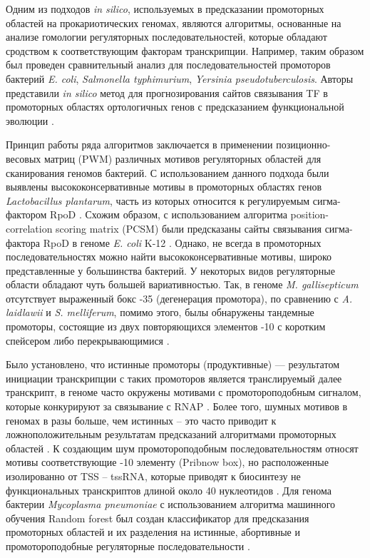 \documentclass[14pt]{extreport}
\begin{document}
Одним из подходов \textit{in silico}, используемых в предсказании промоторных областей на прокариотических геномах, являются алгоритмы, основанные на анализе гомологии регуляторных последовательностей, которые обладают сродством к соответствующим факторам транскрипции. Например, таким образом был проведен сравнительный анализ для последовательностей промоторов бактерий \textit{E. coli}, \textit{Salmonella typhimurium}, \textit{Yersinia pseudotuberculosis}. Авторы представили \textit{in silico} метод для прогнозирования сайтов связывания TF в промоторных областях ортологичных генов с предсказанием функциональной эволюции \cite{mustonen2005evolutionary}.

Принцип работы ряда алгоритмов заключается в применении позиционно-весовых матриц (PWM) различных мотивов регуляторных областей для сканирования геномов бактерий. С использованием данного подхода были выявлены высококонсервативные мотивы в промоторных областях генов \textit{Lactobacillus plantarum}, часть из которых относится к регулируемым сигма-фактором RpoD \cite{todt2012genome}. Схожим образом, с использованием алгоритма position-correlation scoring matrix (PCSM) были предсказаны сайты связывания сигма-фактора RpoD в геноме \textit{E. coli} K-12 \cite{li2006recognition}. Однако, не всегда в промоторных последовательностях можно найти высококонсервативные мотивы, широко представленные у большинства бактерий. У некоторых видов регуляторные области обладают чуть большей вариативностью. Так, в геноме \textit{M. gallisepticum} отсутствует выраженный бокс -35 (дегенерация промотора), по сравнению с \textit{A. laidlawii} и \textit{S. melliferum}, помимо этого, былы обнаружены тандемные промоторы, состоящие из двух повторяющихся элементов -10 с коротким спейсером либо перекрывающимися \cite{fisunov2016reconstruction}.

Было установлено, что истинные промоторы (продуктивные) --- результатом инициации транскрипции с таких промоторов является транслируемый далее транскрипт, в геноме часто окружены мотивами с промотороподобным сигналом, которые конкурируют за связывание с RNAP \cite{huerta2003sigma70}. Более того, шумных мотивов в геномах в разы больше, чем истинных -- это часто приводит к ложноположительным результатам предсказаний алгоритмами промоторных областей \cite{hertz19962, horton1992assessment}. К создающим шум промотороподобным последовательностям относят мотивы соответствующие -10 элементу (Pribnow box), но расположенные изолированно от TSS -- tssRNA, которые приводят к биосинтезу не функциональных транскриптов длиной около 40 нуклеотидов \cite{yus2012transcription}. Для генома бактерии \textit{Mycoplasma pneumoniae} с использованием алгоритма машинного обучения Random forest был создан классификатор для предсказания промоторных областей и их разделения на истинные, абортивные и промотороподобные регуляторные последовательности \cite{llorens2015distinguishing}. 

\end{document}
